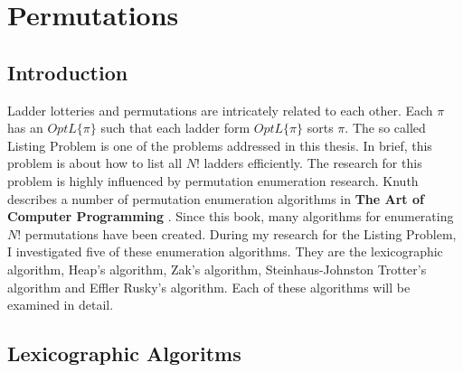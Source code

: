 \section{Permutations}
\subsection{Introduction}
Ladder lotteries and permutations are intricately related to each other. Each $\pi$ has an $OptL\{\pi\}$ such that 
each ladder form $OptL\{\pi\}$ sorts $\pi$. The so called Listing Problem is one of the problems addressed in this thesis.
In brief, this problem is about how to list all $N!$ ladders efficiently. The research for this problem is highly influenced 
by permutation enumeration research. Knuth describes a number of 
permutation enumeration algorithms in \textbf{The Art of Computer Programming} \cite{A18}. Since this book, many algorithms for 
enumerating $N!$ permutations have been created. During my research for the Listing Problem, I investigated five of these 
enumeration algorithms. They are the lexicographic algorithm, Heap's algorithm, Zak's algorithm, Steinhaus-Johnston Trotter's algorithm 
and Effler Rusky's algorithm. Each of these algorithms will be examined in detail.

\subsection{Lexicographic Algoritms}

